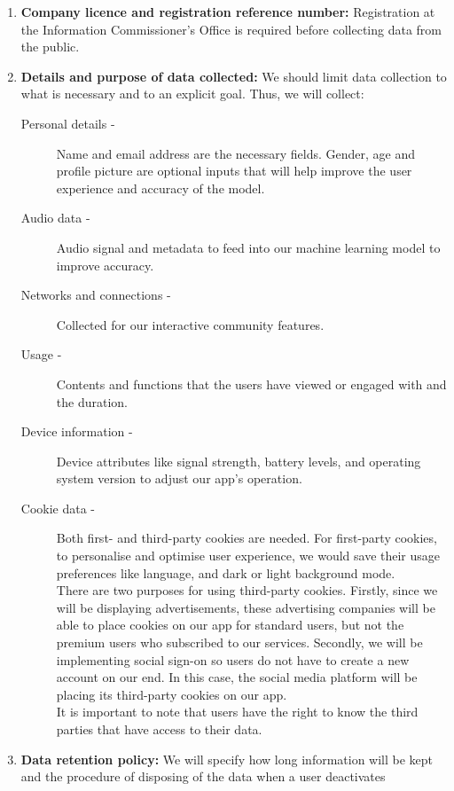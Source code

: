 \begin{enumerate}
    \item \textbf{Company licence and registration reference number:} Registration at the Information Commissioner's Office is required
    before collecting data from the public.
    \item \textbf{Details and purpose of data collected:} We should limit data collection to what is necessary and to an explicit goal.
    Thus, we will collect:
    \begin{description}
        \item[Personal details -] Name and email address are the necessary fields. Gender, age and profile picture are optional inputs 
        that will help improve the user experience and accuracy of the model. 
        \item[Audio data -] Audio signal and metadata to feed into our machine learning model to improve accuracy.
        \item[Networks and connections -] Collected for our interactive community features.
        \item[Usage -] Contents and functions that the users have viewed or engaged with and the duration.
        \item[Device information -] Device attributes like signal strength, battery levels, and operating system version to adjust our app's operation.
        \item[Cookie data -] Both first- and third-party cookies are needed. For first-party cookies, to personalise and optimise user
        experience, we would save their usage preferences like language, and dark or light background mode. 
        \\There are two purposes for using third-party cookies. Firstly, since we will be displaying advertisements, 
        these advertising companies will be able to place cookies on our app for standard users, but not the premium users who subscribed to our services. 
        Secondly, we will be implementing social sign-on so users do not have to create a new account on our end. In this case, the social media 
        platform will be placing its third-party cookies on our app.
        \\It is important to note that users have the right to know the third parties that have access to their data.
    \end{description}
    \item \textbf{Data retention policy:} We will specify how long information will be kept and the procedure of disposing of the data when a user deactivates

\end{enumerate}
